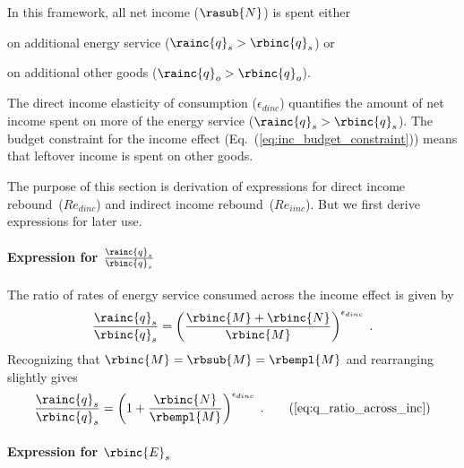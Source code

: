 In this framework, all net income ($\rasub{N}$) is spent either 
%
\begin{enumerate*}[label={(\alph*)}]
	
  \item on additional energy service ($\rainc{q}_s > \rbinc{q}_s$) or
  
  \item on additional other goods ($\rainc{q}_o > \rbinc{q}_o$).
    
\end{enumerate*}
%
The direct income elasticity of consumption ($\epsilon_{dinc}$) 
quantifies the amount of net income spent 
on more of the energy service ($\rainc{q}_s > \rbinc{q}_s$).
The budget constraint for the income effect (Eq.~(\ref{eq:inc_budget_constraint})) 
means that leftover income is spent on other goods.

The purpose of this section is derivation of expressions for 
direct income rebound~($Re_{dinc}$) and indirect income rebound~($Re_{iinc}$).
But we first derive expressions for later use.


\paragraph{Expression for $\frac{\rainc{q}_s}{\rbinc{q}_s}$}
\label{sec:qs_ratio}

The ratio of rates of energy service consumed across the income effect is given by
%
\begin{equation}
  \frac{\rainc{q}_s}{\rbinc{q}_s} = \left( \frac{\rbinc{M} + \rbinc{N}}{\rbinc{M}} \right) ^ {\epsilon_{dinc}} \; .
\end{equation}
%
Recognizing that $\rbinc{M} = \rbsub{M} = \rbempl{M}$ and rearranging slightly gives
%
\begin{equation}
  \frac{\rainc{q}_s}{\rbinc{q}_s} = \left( 1 + \frac{\rbinc{N}}{\rbempl{M}} \right) ^ {\epsilon_{dinc}} \; . 
                                                                                \tag{\ref{eq:q_ratio_across_inc}}
\end{equation}


\paragraph{Expression for $\rbinc{E}_s$} 
\label{sec:E_dot_s_hat_expression}

